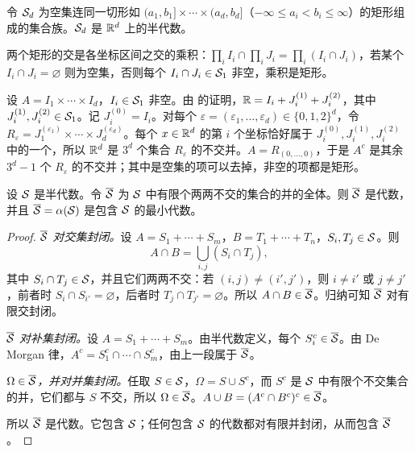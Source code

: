 \begin{example}[矩形]\label{ex:extension:Sd}
令 $\mathcal{S}_d$ 为空集连同一切形如 $(a_1,b_1]\times\cdots\times(a_d,b_d]$（$-\infty\leqslant a_i<b_i\leqslant\infty$）的矩形组成的集合族。$\mathcal{S}_d$ 是 $\mathbb{R}^d$ 上的半代数。

两个矩形的交是各坐标区间之交的乘积：$\prod_i I_i\cap\prod_i J_i=\prod_i(I_i\cap J_i)$，若某个 $I_i\cap J_i=\varnothing$ 则为空集，否则每个 $I_i\cap J_i\in\mathcal{S}_1$ 非空，乘积是矩形。

设 $A=I_1\times\cdots\times I_d$，$I_i\in\mathcal{S}_1$ 非空。由 的证明，$\mathbb{R}=I_i+J_i^{(1)}+J_i^{(2)}$，其中 $J_i^{(1)},J_i^{(2)}\in\mathcal{S}_1$。记 $J_i^{(0)}=I_i$。对每个 $\varepsilon=(\varepsilon_1,\dots,\varepsilon_d)\in\{0,1,2\}^d$，令 $R_\varepsilon=J_1^{(\varepsilon_1)}\times\cdots\times J_d^{(\varepsilon_d)}$。每个 $x\in\mathbb{R}^d$ 的第 $i$ 个坐标恰好属于 $J_i^{(0)},J_i^{(1)},J_i^{(2)}$ 中的一个，所以 $\mathbb{R}^d$ 是 $3^d$ 个集合 $R_\varepsilon$ 的不交并。$A=R_{(0,\dots,0)}$，于是 $A^c$ 是其余 $3^d-1$ 个 $R_\varepsilon$ 的不交并；其中是空集的项可以去掉，非空的项都是矩形。
\end{example}

\begin{lemma}[半代数生成的代数]\label{lem:extension:algebra-from-semialgebra}
设 $\mathcal{S}$ 是半代数。令 $\overline{\mathcal{S}}$ 为 $\mathcal{S}$ 中有限个两两不交的集合的并的全体。则 $\overline{\mathcal{S}}$ 是代数，并且 $\overline{\mathcal{S}}=\alpha(\mathcal{S})$ 是包含 $\mathcal{S}$ 的最小代数。
\end{lemma}
\begin{proof}
\emph{$\overline{\mathcal{S}}$ 对交集封闭。}设 $A=S_1+\cdots+S_m$，$B=T_1+\cdots+T_n$，$S_i,T_j\in\mathcal{S}$。则
\[
A\cap B=\bigcup_{i,j}(S_i\cap T_j),
\]
其中 $S_i\cap T_j\in\mathcal{S}$，并且它们两两不交：若 $(i,j)\neq(i',j')$，则 $i\neq i'$ 或 $j\neq j'$，前者时 $S_i\cap S_{i'}=\varnothing$，后者时 $T_j\cap T_{j'}=\varnothing$。所以 $A\cap B\in\overline{\mathcal{S}}$。归纳可知 $\overline{\mathcal{S}}$ 对有限交封闭。

\emph{$\overline{\mathcal{S}}$ 对补集封闭。}设 $A=S_1+\cdots+S_m$。由半代数定义，每个 $S_i^c\in\overline{\mathcal{S}}$。由 De Morgan 律，$A^c=S_1^c\cap\cdots\cap S_m^c$，由上一段属于 $\overline{\mathcal{S}}$。

\emph{$\Omega\in\overline{\mathcal{S}}$，并对并集封闭。}任取 $S\in\mathcal{S}$，$\Omega=S\cup S^c$，而 $S^c$ 是 $\mathcal{S}$ 中有限个不交集合的并，它们都与 $S$ 不交，所以 $\Omega\in\overline{\mathcal{S}}$。$A\cup B=(A^c\cap B^c)^c\in\overline{\mathcal{S}}$。

所以 $\overline{\mathcal{S}}$ 是代数。它包含 $\mathcal{S}$；任何包含 $\mathcal{S}$ 的代数都对有限并封闭，从而包含 $\overline{\mathcal{S}}$。
\end{proof}

